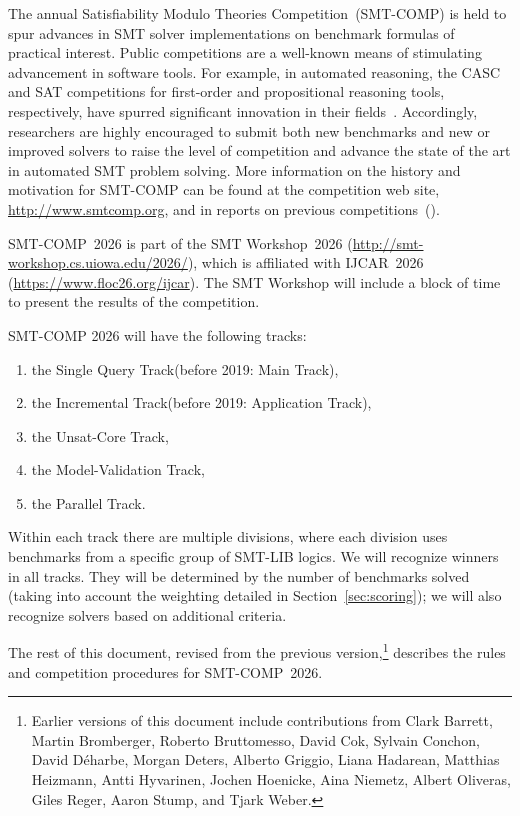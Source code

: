 \documentclass[12pt]{article}
\newcommand{\maintrack}{Single Query Track\xspace}
\newcommand{\inctrack}{Incremental Track\xspace}
\newcommand{\ucoretrack}{Unsat-Core Track\xspace}
\newcommand{\mvaltrack}{Model-Validation Track\xspace}
\newcommand{\paralleltrack}{Parallel Track\xspace}
\begin{document}
The annual Satisfiability Modulo Theories Competition~(SMT-COMP) is
held to spur advances in SMT solver implementations on benchmark
formulas of practical interest.  Public competitions are a well-known
means of stimulating advancement in software tools.  For example, in
automated reasoning, the CASC and SAT competitions for first-order and
propositional reasoning tools, respectively, have spurred significant
innovation in their fields~\cite{leberre+03,PSS02}.
%
Accordingly, researchers are highly encouraged to submit both new
benchmarks and new or improved solvers to raise the level of
competition and advance the state of the art in automated SMT problem
solving. More information
on the history and motivation for SMT-COMP can be found at the
competition web site, \url{http://www.smtcomp.org}, and in reports on
previous
competitions~(\cite{SMTCOMP-JAR,SMTCOMP-FMSD,BDOS08,SMTCOMP-2008,CDW14,SMTCOMP-2012,CSW15}).

SMT-COMP~2026 is part of the SMT Workshop~2026
(\url{http://smt-workshop.cs.uiowa.edu/2026/}),
which is affiliated with IJCAR~2026 (\url{https://www.floc26.org/ijcar}).
The SMT Workshop will include a block of time to present the results of the
competition.

SMT-COMP 2026 will have the following tracks:
\begin{enumerate}
  \item the \maintrack (before 2019: Main Track),
  \item the \inctrack (before 2019: Application Track),
  \item the \ucoretrack,
  \item the \mvaltrack,
  \item the \paralleltrack{}.
\end{enumerate}

%
Within each track there are multiple divisions, where each division
uses benchmarks from a specific group of SMT-LIB logics.
%
We will recognize winners in all tracks.
%
They will be determined by the number of benchmarks solved (taking into account
the weighting detailed in Section~\ref{sec:scoring}); we will also recognize
solvers based on additional criteria.

The rest of this document, revised from the previous
version,\footnote{Earlier versions of this document include
  contributions from Clark Barrett, Martin Bromberger, Roberto Bruttomesso, David Cok,
  Sylvain Conchon, David D{\'e}harbe, Morgan Deters, Alberto Griggio,
  Liana Hadarean,
  Matthias Heizmann, Antti Hyvarinen, Jochen Hoenicke, Aina Niemetz, Albert Oliveras, Giles Reger, Aaron Stump,
  and Tjark Weber.}  describes the rules and competition procedures for
SMT-COMP~2026.
%
\end{document}
